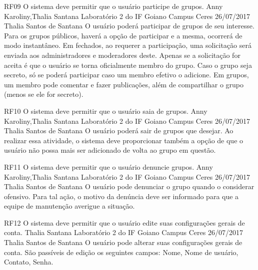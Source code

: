  \requisitoFuncional
 {RF09}
 {O sistema deve permitir que o usuário participe de grupos.}
 {Anny Karoliny,Thalia Santana}
 {Laboratório 2 do IF Goiano Campus Ceres}
 {26/07/2017}
 {Thalia Santos de Santana}
 {O usuário poderá participar de grupos de seu interesse. Para os grupos públicos, haverá a opção de participar e a mesma,  ocorrerá de modo instantâneo. Em fechados, ao requerer a participação, uma solicitação será enviada aos administradores e moderadores deste. Apenas se a solicitação for aceita é que o usuário se torna oficialmente membro do grupo. Caso o grupo seja secreto, só se poderá participar caso um membro efetivo o adicione.  Em grupos, um membro pode comentar e fazer publicações, além de compartilhar o grupo (menos se ele for secreto).
 }
 
 \requisitoFuncional
 {RF10}
 {O sistema deve permitir que o usuário saia de grupos.}
 {Anny Karoliny,Thalia Santana}
 {Laboratório 2 do IF Goiano Campus Ceres}
 {26/07/2017}
 {Thalia Santos de Santana}
 {O usuário poderá sair de grupos que desejar. Ao realizar essa atividade, o sistema deve proporcionar também a opção de que o usuário não possa mais ser adicionado de volta ao grupo em questão.
 }
 
 \requisitoFuncional
 {RF11}
 {O sistema deve permitir que o usuário denuncie grupos.}
 {Anny Karoliny,Thalia Santana}
 {Laboratório 2 do IF Goiano Campus Ceres}
 {26/07/2017}
 {Thalia Santos de Santana}
 {O usuário pode denunciar o grupo quando o considerar ofensivo. Para tal ação, o motivo da denúncia deve ser informado para que a equipe de manutenção averigue a situação.
 }
 
 \requisitoFuncional
 {RF12}
 {O sistema deve permitir que o usuário edite suas configurações gerais de conta.}
 {Thalia Santana}
 {Laboratório 2 do IF Goiano Campus Ceres}
 {26/07/2017}
 {Thalia Santos de Santana}
 {O usuário pode alterar suas configurações gerais de conta. São passíveis de edição os seguintes campos: Nome, Nome de usuário, Contato,  Senha.
 }
 
